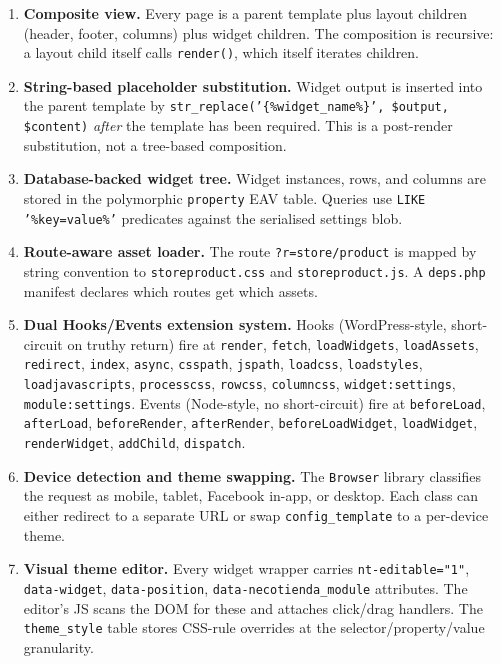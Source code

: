 \documentclass[11pt,a4paper]{article}
\begin{document}
\begin{enumerate}[leftmargin=1.6em,itemsep=2pt]
  \item \textbf{Composite view.} Every page is a parent template
        plus layout children (header, footer, columns) plus widget
        children. The composition is recursive: a layout child
        itself calls \texttt{render()}, which itself iterates
        children.
  \item \textbf{String-based placeholder substitution.} Widget
        output is inserted into the parent template by
        \texttt{str\_replace('\{\%widget\_name\%\}', \$output,
        \$content)} \emph{after} the template has been required.
        This is a post-render substitution, not a tree-based
        composition.
  \item \textbf{Database-backed widget tree.} Widget instances,
        rows, and columns are stored in the polymorphic
        \texttt{property} EAV table. Queries use
        \texttt{LIKE '\%key=value\%'} predicates against the
        serialised settings blob.
  \item \textbf{Route-aware asset loader.} The route
        \texttt{?r=store/product} is mapped by string convention
        to \texttt{storeproduct.css} and \texttt{storeproduct.js}.
        A \texttt{deps.php} manifest declares which routes get
        which assets.
  \item \textbf{Dual Hooks/Events extension system.} Hooks
        (WordPress-style, short-circuit on truthy return) fire at
        \texttt{render}, \texttt{fetch}, \texttt{loadWidgets},
        \texttt{loadAssets}, \texttt{redirect}, \texttt{index},
        \texttt{async}, \texttt{csspath}, \texttt{jspath},
        \texttt{loadcss}, \texttt{loadstyles}, \texttt{loadjavascripts},
        \texttt{processcss}, \texttt{rowcss}, \texttt{columncss},
        \texttt{widget:settings}, \texttt{module:settings}. Events
        (Node-style, no short-circuit) fire at \texttt{beforeLoad},
        \texttt{afterLoad}, \texttt{beforeRender}, \texttt{afterRender},
        \texttt{beforeLoadWidget}, \texttt{loadWidget},
        \texttt{renderWidget}, \texttt{addChild}, \texttt{dispatch}.
  \item \textbf{Device detection and theme swapping.} The
        \texttt{Browser} library classifies the request as mobile,
        tablet, Facebook in-app, or desktop. Each class can either
        redirect to a separate URL or swap \texttt{config\_template}
        to a per-device theme.
  \item \textbf{Visual theme editor.} Every widget wrapper carries
        \texttt{nt-editable="1"}, \texttt{data-widget},
        \texttt{data-position}, \texttt{data-necotienda\_module}
        attributes. The editor's JS scans the DOM for these and
        attaches click/drag handlers. The \texttt{theme\_style}
        table stores CSS-rule overrides at the
        selector/property/value granularity.
\end{enumerate}
\end{document}
